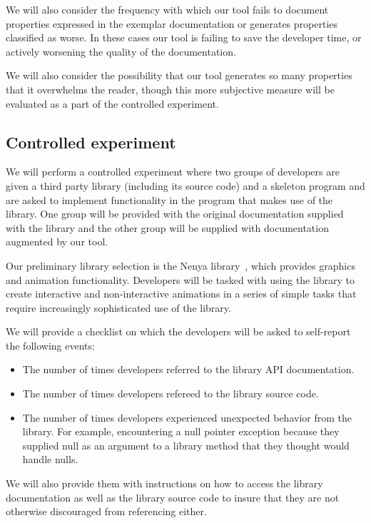 We will also consider the frequency with which our tool fails to document
properties expressed in the exemplar documentation or generates properties
classified as worse. In these cases our tool is failing to save the developer
time, or actively worsening the quality of the documentation.

We will also consider the possibility that our tool generates so many
properties that it overwhelms the reader, though this more subjective measure
will be evaluated as a part of the controlled experiment.

\subsection{Controlled experiment}

We will perform a controlled experiment where two groups of developers are
given a third party library (including its source code) and a skeleton program
and are asked to implement functionality in the program that makes use of the
library. One group will be provided with the original documentation supplied
with the library and the other group will be supplied with documentation
augmented by our tool.

Our preliminary library selection is the Nenya library~\cite{nenya}, which
provides graphics and animation functionality. Developers will be tasked with
using the library to create interactive and non-interactive animations in a
series of simple tasks that require increasingly sophisticated use of the
library.

We will provide a checklist on which the developers will be asked to
self-report the following events:

\begin{itemize}
\item The number of times developers referred to the library API documentation.
\item The number of times developers refereed to the library source code.
\item The number of times developers experienced unexpected behavior from the
  library. For example, encountering a null pointer exception because they
  supplied null as an argument to a library method that they thought would
  handle nulls.
\end{itemize}

We will also provide them with instructions on how to access the library
documentation as well as the library source code to insure that they are not
otherwise discouraged from referencing either.

